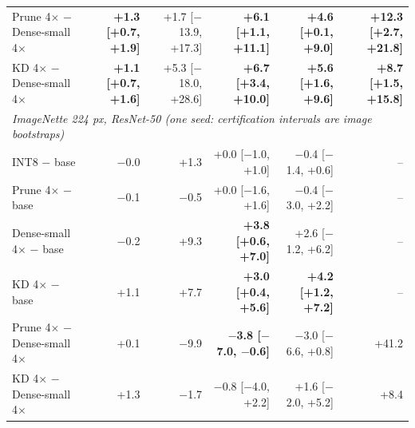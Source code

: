 \begin{tabular}{lrrrrr}
Prune 4$\times$ $-$ Dense-small 4$\times$ & \textbf{+1.3 {\scriptsize[+0.7, +1.9]}} & +1.7 {\scriptsize[$-$13.9, +17.3]} & \textbf{+6.1 {\scriptsize[+1.1, +11.1]}} & \textbf{+4.6 {\scriptsize[+0.1, +9.0]}} & \textbf{+12.3 {\scriptsize[+2.7, +21.8]}} \\
KD 4$\times$ $-$ Dense-small 4$\times$ & \textbf{+1.1 {\scriptsize[+0.7, +1.6]}} & +5.3 {\scriptsize[$-$18.0, +28.6]} & \textbf{+6.7 {\scriptsize[+3.4, +10.0]}} & \textbf{+5.6 {\scriptsize[+1.6, +9.6]}} & \textbf{+8.7 {\scriptsize[+1.5, +15.8]}} \\
\midrule
\multicolumn{6}{l}{\textit{ImageNette 224 px, ResNet-50 (one seed: certification intervals are image bootstraps)}} \\
INT8 $-$ base & $-$0.0 & +1.3 & +0.0 {\scriptsize[$-$1.0, +1.0]} & $-$0.4 {\scriptsize[$-$1.4, +0.6]} & -- \\
Prune 4$\times$ $-$ base & $-$0.1 & $-$0.5 & +0.0 {\scriptsize[$-$1.6, +1.6]} & $-$0.4 {\scriptsize[$-$3.0, +2.2]} & -- \\
Dense-small 4$\times$ $-$ base & $-$0.2 & +9.3 & \textbf{+3.8 {\scriptsize[+0.6, +7.0]}} & +2.6 {\scriptsize[$-$1.2, +6.2]} & -- \\
KD 4$\times$ $-$ base & +1.1 & +7.7 & \textbf{+3.0 {\scriptsize[+0.4, +5.6]}} & \textbf{+4.2 {\scriptsize[+1.2, +7.2]}} & -- \\
Prune 4$\times$ $-$ Dense-small 4$\times$ & +0.1 & $-$9.9 & \textbf{$-$3.8 {\scriptsize[$-$7.0, $-$0.6]}} & $-$3.0 {\scriptsize[$-$6.6, +0.8]} & +41.2 \\
KD 4$\times$ $-$ Dense-small 4$\times$ & +1.3 & $-$1.7 & $-$0.8 {\scriptsize[$-$4.0, +2.2]} & +1.6 {\scriptsize[$-$2.0, +5.2]} & +8.4 \\
\bottomrule
\end{tabular}
